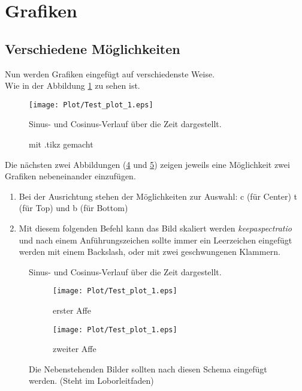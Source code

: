 \section{Grafiken}

\subsection{Verschiedene Möglichkeiten}

Nun werden Grafiken eingefügt auf verschiedenste Weise.\\
Wie in der Abbildung \ref{fig:test_plot_1} zu sehen ist.

\begin{figure}[!ht]
\centering
\texttt{[image: Plot/Test\_plot\_1.eps]}
\caption[60\,\% der Textbreite]{Sinus- und Cosinus-Verlauf über die Zeit dargestellt.\cite{Sensoren}}
\label{fig:test_plot_1}
\end{figure}

\begin{figure}[!ht]
\centering

\caption{mit .tikz gemacht}
\label{fig:myfirstfig}
\end{figure}

\clearpage
Die nächsten zwei Abbildungen (\ref{fig:subhouse21} und \ref{fig:subhouse22}) zeigen jeweils eine Möglichkeit zwei Grafiken nebeneinander einzufügen.\cite{Sensoren}
\begin{enumerate}
    \item Bei der Ausrichtung stehen der Möglichkeiten zur Auswahl: c (für Center) t (für Top) und b (für Bottom)
    \item Mit diesem folgenden Befehl kann das Bild skaliert werden \glqq\textit{keepaspectratio}\grqq{} und nach einem Anführungszeichen sollte immer ein Leerzeichen eingefügt werden mit einem Backslash, oder mit zwei geschwungenen Klammern.
\end{enumerate}

\begin{figure}[!ht]
\centering

\caption[]{Sinus- und Cosinus-Verlauf über die Zeit dargestellt.}
\label{fig:myfirstfi}
\end{figure}

\clearpage
\begin{figure}[!ht]
    \begin{subfigure}[b]{.48\textwidth}
    \centering
    \texttt{[image: Plot/Test\_plot\_1.eps]}
    \caption{erster Affe}
    \label{fig:subhouse21}
    \end{subfigure}
\hfil
    \begin{subfigure}[b]{.48\textwidth}
    \centering
    \texttt{[image: Plot/Test\_plot\_1.eps]}
    \caption{zweiter Affe}
    \label{fig:subhouse22}
    \end{subfigure}
\caption[zwei Pferde]{\centering Die Nebenstehenden Bilder sollten nach diesen Schema eingefügt werden. (Steht im Loborleitfaden)}    
\label{fig:Doppelbild}
\end{figure}

